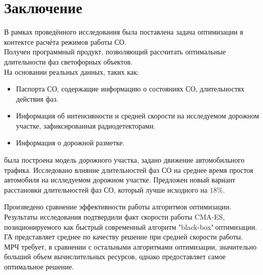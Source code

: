 \chapter*{Заключение} \label{ch-conclusion}

В рамках проведённого исследования была поставлена задача оптимизации в контектсе расчёта режимов работы СО.\\
Получен программный продукт, позволяющий рассчитать оптимальные длительности фаз светофорных объектов.\\
На основании реальных данных, таких как:
\begin{itemize}
	\item Паспорта СО, содержащие информацию о состояниях СО, длительностях действия фаз.
	\item Информация об интенсивности и средней скорости на исследуемом дорожном участке, зафиксированная радиодетекторами.
	\item Информация о дорожной разметке.
\end{itemize}
была построена модель дорожного участка, задано движение автомобильного трафика. Исследовано влияние длительностей фаз СО на среднее время простоя автомобиля на ислледуемом дорожном участке. Предложен новый вариант расстановки длительностей фаз СО, который лучше исходного на $18\%$.

Произведено сравнение эффективности работы алгоритмов оптимизации.\\
Результаты исследования подтвердили факт скорости работы CMA-ES, позиционируемого как быстрый современный алгоритм "black-box"$\ $оптимизации. ГА представляет среднее по качеству решение при средней скорости работы. МРЧ требует, в сравнении с остальными алгоритмами оптимизации, значительно больший объем вычислительных ресурсов, однако предоставляет самое оптимальное решение.\\
